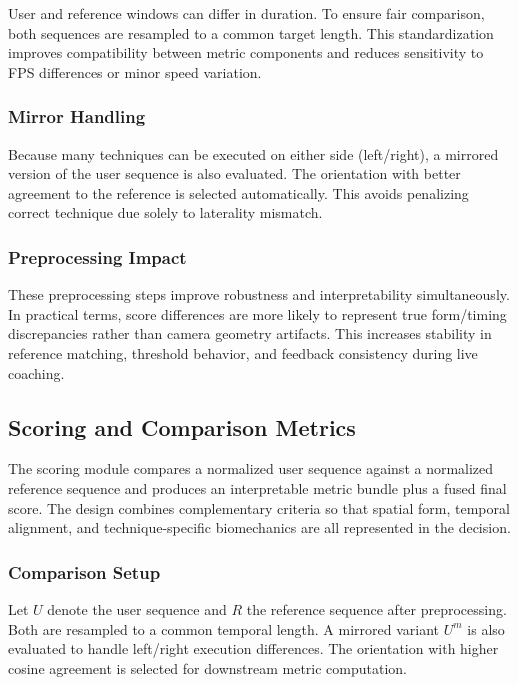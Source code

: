 \documentclass[12pt]{article}
\begin{document}
{User and reference windows can differ in duration. To ensure fair comparison, both sequences are resampled to a common target length. This standardization improves compatibility between metric components and reduces sensitivity to FPS differences or minor speed variation.

\subsubsection{Mirror Handling}

Because many techniques can be executed on either side (left/right), a mirrored version of the user sequence is also evaluated. The orientation with better agreement to the reference is selected automatically. This avoids penalizing correct technique due solely to laterality mismatch.

\subsubsection{Preprocessing Impact}

These preprocessing steps improve robustness and interpretability simultaneously. In practical terms, score differences are more likely to represent true form/timing discrepancies rather than camera geometry artifacts. This increases stability in reference matching, threshold behavior, and feedback consistency during live coaching.

\subsection{Scoring and Comparison Metrics}

The scoring module compares a normalized user sequence against a normalized reference sequence and produces an interpretable metric bundle plus a fused final score. The design combines complementary criteria so that spatial form, temporal alignment, and technique-specific biomechanics are all represented in the decision.

\subsubsection{Comparison Setup}

Let \(U\) denote the user sequence and \(R\) the reference sequence after preprocessing. Both are resampled to a common temporal length. A mirrored variant \(U^{m}\) is also evaluated to handle left/right execution differences. The orientation with higher cosine agreement is selected for downstream metric computation.

}
\end{document}
